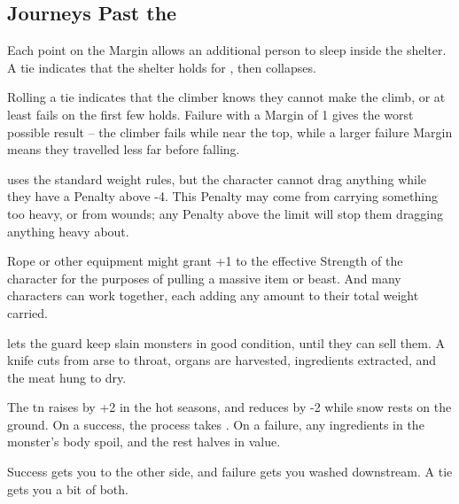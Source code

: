 \begin{multicols}{2}
\columnbreak

\subsection{Journeys Past the }

Each point on the Margin allows an additional person to sleep inside the shelter.
A tie indicates that the shelter holds for , then collapses.


Rolling a tie indicates that the climber knows they cannot make the climb, or at least fails on the first few holds.
Failure with a Margin of 1 gives the worst possible result -- the climber fails while near the top, while a larger failure Margin means they travelled less far before falling.

uses the standard \gls{weight} rules, but the character cannot drag anything while they have a Penalty above -4.
This Penalty may come from carrying something too heavy, or from wounds; any Penalty above the limit will stop them dragging anything heavy about.

Rope or other equipment might grant +1 to the effective Strength of the character for the purposes of pulling a massive item or beast.
And many characters can work together, each adding any amount to their total \gls{weight} carried.

lets the \gls{guard} keep slain \glspl{monster} in good condition, until they can sell them.
A knife cuts from arse to throat, organs are harvested, \glspl{ingredient} extracted, and the meat hung to dry.

The \gls{tn} raises by +2 in the hot seasons, and reduces by -2 while snow rests on the ground.
On a success, the process takes .
On a failure, any \glspl{ingredient} in the \gls{monster}'s body spoil, and the rest halves in value.

Success gets you to the other side, and failure gets you washed downstream.
A tie gets you a bit of both.

\subsubsection{}


\end{multicols}
